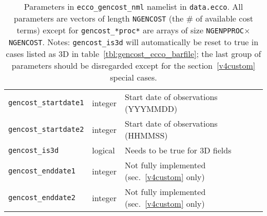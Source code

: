 \begin{table}[!ht]
\begin{tabular}{lll}
\texttt{gencost\_startdate1} 	&	integer			&	Start date of observations (YYYMMDD)	\\
\texttt{gencost\_startdate2} 	&	integer			&	Start date of observations (HHMMSS)				\\
\texttt{gencost\_is3d}		&	logical 		&	Needs to be true for 3D fields \\
\hline
\texttt{gencost\_enddate1} 		&	integer	&	Not fully implemented (sec.~\ref{v4custom} only)\\
\texttt{gencost\_enddate2} 		&	integer	&	Not fully implemented (sec.~\ref{v4custom} only)\\
\end{tabular}
\caption{Parameters in \texttt{ecco\_gencost\_nml} namelist in \texttt{data.ecco}. All parameters are vectors of length \texttt{NGENCOST} (the \# of available cost terms) except for \texttt{gencost\_*proc*} are arrays of size \texttt{NGENPPROC}$\times$\texttt{NGENCOST}. Notes: \texttt{gencost\_is3d} will automatically be reset to true in cases listed as 3D in table~\ref{tbl:gencost_ecco_barfile}; the last group of parameters should be disregarded except for the section~\ref{v4custom} special cases.}
\label{tbl:gencost_ecco_params}
\end{table}

